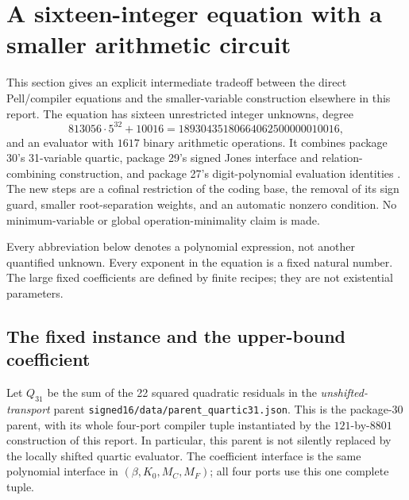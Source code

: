 \section{A sixteen-integer equation with a smaller arithmetic circuit}
\label{sec:signed16}

This section gives an explicit intermediate tradeoff between the direct
Pell/compiler equations and the smaller-variable construction elsewhere in
this report.  The equation has sixteen unrestricted integer unknowns,
degree
\[
  813056\cdot5^{32}+10016
  =18930435180664062500000010016,
\]
and an evaluator with \(1617\) binary arithmetic operations.  It combines
package 30's 31-variable quartic, package 29's signed Jones interface and
relation-combining construction, and package 27's digit-polynomial
evaluation identities \cite{repo27,repo29,repo30}.  The new steps are a cofinal restriction of the
coding base, the removal of its sign guard, smaller root-separation weights,
and an automatic nonzero condition.  No minimum-variable or global
operation-minimality claim is made.

Every abbreviation below denotes a polynomial expression, not another
quantified unknown.  Every exponent in the equation is a fixed natural
number.  The large fixed coefficients are defined by finite recipes; they
are not existential parameters.

\subsection{The fixed instance and the upper-bound coefficient}

Let \(Q_{31}\) be the sum of the 22 squared quadratic residuals in the
\emph{unshifted-transport} parent
\texttt{signed16/data/parent\_quartic31.json}.  This is the package-30 parent,
with its whole four-port compiler tuple instantiated by the
\(121\)-by-\(8801\) construction of this report.  In particular, this parent
is not silently replaced by the locally shifted quartic evaluator.
The coefficient interface is the same polynomial interface in
\((\beta,K_0,M_C,M_F)\); all four ports use this one complete tuple.


